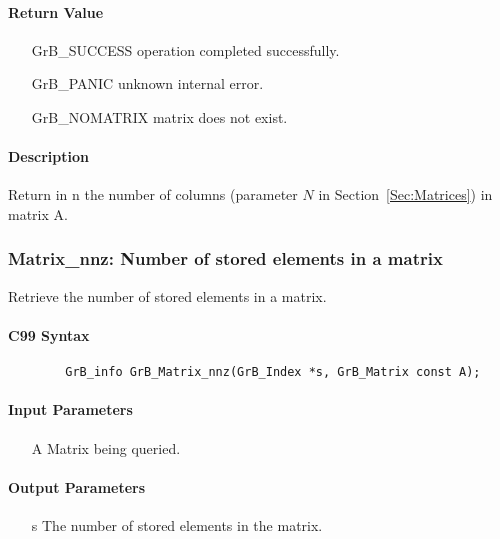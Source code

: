 \paragraph{Return Value}

\begin{itemize}[leftmargin=2.1in]
\item[{\sf GrB\_SUCCESS}]   operation completed successfully.
\item[{\sf GrB\_PANIC}]     unknown internal error.
\item[{\sf GrB\_NOMATRIX}]  matrix does not exist.
\end{itemize}

\paragraph{Description}

Return in {\sf n} the number of columns (parameter $N$ in Section~\ref{Sec:Matrices}) in matrix {\sf A}.

\subsubsection{{\sf Matrix\_nnz}: Number of stored elements in a matrix}

Retrieve the number of stored elements in a matrix.

\paragraph{C99 Syntax}

\begin{verbatim}
        GrB_info GrB_Matrix_nnz(GrB_Index *s, GrB_Matrix const A);
\end{verbatim}

\paragraph{Input Parameters}

\begin{itemize}[leftmargin=1.1in]
    \item[{\sf A}] Matrix being queried.
\end{itemize}

\paragraph{Output Parameters}
\begin{itemize}[leftmargin=1.1in]
    \item[{\sf s}] The number of stored elements in the matrix.
\end{itemize}

